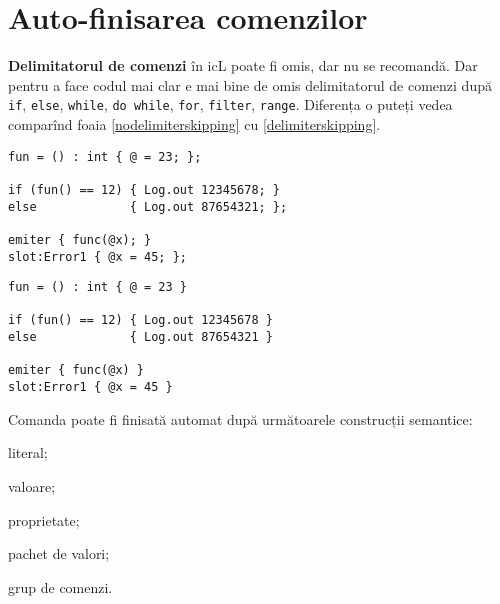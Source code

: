 \section{Auto-finisarea comenzilor}

\textbf{Delimitatorul de comenzi} în icL poate fi omis, dar nu se recomandă. Dar pentru a face codul mai clar e mai bine de omis delimitatorul de comenzi după \texttt{if}, \texttt{else}, \texttt{while}, \texttt{do while}, \texttt{for}, \texttt{filter}, \texttt{range}. Diferența o puteți vedea comparînd foaia \ref{nodelimiterskipping} cu  \ref{delimiterskipping}.

\begin{sourcecode}
\label{nodelimiterskipping}
\begin{verbatim}
fun = () : int { @ = 23; };

if (fun() == 12) { Log.out 12345678; } 
else             { Log.out 87654321; };

emiter { func(@x); }
slot:Error1 { @x = 45; };
\end{verbatim}
\end{sourcecode}

\begin{sourcecode}
\label{delimiterskipping}
\begin{verbatim}
fun = () : int { @ = 23 }

if (fun() == 12) { Log.out 12345678 } 
else             { Log.out 87654321 }

emiter { func(@x) }
slot:Error1 { @x = 45 }
\end{verbatim}
\end{sourcecode}

Comanda poate fi finisată automat după următoarele construcții semantice:
\begin{icItems}
	\item literal;
	\item valoare;
	\item proprietate;
	\item pachet de valori;
	\item grup de comenzi.
\end{icItems}